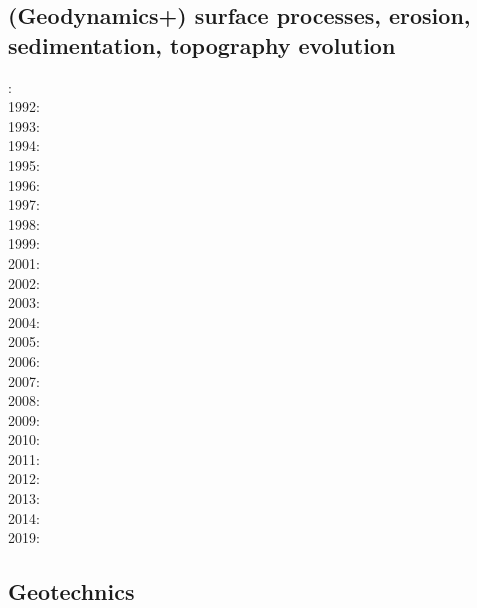 \subsection*{(Geodynamics+) surface processes, erosion, sedimentation, topography evolution}
 

: \cite{cull60}\\
1992: \cite{befh92}\\
1993: \cite{povp93}\\
1994: \cite{howa94}\cite{koon94}\cite{kobe94}\\
1995: \cite{chmm95}\cite{koon95}\\
1996: \cite{avbu96}\cite{bekh96}\cite{kobe96}\\
1997: \cite{brsa97}\cite{gaft97}\cite{babr97}\\
1998: \cite{deea98}\cite{vabr98}\cite{koon98}\\
1999: \cite{will99a}\cite{bupi99}\cite{babr99}\\
2001: \cite{zemk01}\cite{tulg01}\cite{brsh01}\cite{bupo01}\cite{coul01}\cite{crda01}\\
2002: \cite{wibr02}\cite{mobr02}\cite{garc02}\\
2003: \cite{brau03}\\
2004: \cite{fijj04}\cite{gocl04}\\
2005: \cite{lave05}\cite{will05}\\
2006: \cite{rosw06}\cite{brau06gsl}\cite{bocr06}\\
2007: \cite{buto07}\cite{sebp07}\\
2008: \cite{alle08}\cite{rowf08}\\
2009: \cite{whip09}\cite{kuhe09}\cite{makh09}\cite{pina09}\\
2010: \cite{will10}\cite{tuha10}\cite{brau10b}\cite{brau10}\cite{brya10}\cite{cmwt10}\\
2011: \cite{robr11}\cite{grhd11}\\
2012: \cite{kiwh12}\\
2013: \cite{vehc13}\cite{brwi13}\cite{fihv13a}\cite{fihv13b}\cite{brrs13}\cite{chgz13} \\
2014: \cite{crbr14}\cite{cokm14}\cite{erhv14}\cite{erhv15} \\
2019: \cite{anpa19}

\subsection*{Geotechnics}

